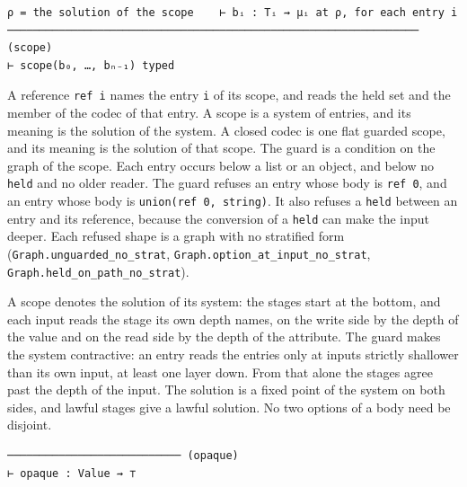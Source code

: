 \begin{definition}[(scope)]
\label{rule:scope}
\leanok
\begin{verbatim}
ρ = the solution of the scope    ⊢ bᵢ : Tᵢ ⇝ μᵢ at ρ, for each entry i
──────────────────────────────────────────────────────────────── (scope)
⊢ scope(b₀, …, bₙ₋₁) typed
\end{verbatim}
\end{definition}

A reference \texttt{ref\ i} names the entry \texttt{i} of its scope, and reads the held set and the member of the codec of
that entry. A scope is a system of entries, and its meaning is the solution of the system. A closed codec is one
flat guarded scope, and its meaning is the solution of that scope. The guard is a
condition on the graph of the scope. Each entry occurs below a list or an object, and below no \texttt{held} and no
older reader. The guard refuses an entry whose body is \texttt{ref\ 0}, and an entry whose body is
\texttt{union(ref\ 0,\ string)}. It also refuses a \texttt{held} between an entry and its reference, because the
conversion of a \texttt{held} can make the input deeper.
Each refused shape is a graph with no stratified form
(\texttt{Graph.unguarded\_no\_strat}, \texttt{Graph.option\_at\_input\_no\_strat}, \texttt{Graph.held\_on\_path\_no\_strat}).

\begin{theorem}
\label{thm:guarded-recursion}
\leanok
A scope denotes the solution of its system: the stages start at the bottom, and each input reads
the stage its own depth names, on the write side by the depth of the value and on the read side by the
depth of the attribute. The guard makes the system contractive: an entry reads the entries only at inputs strictly
shallower than its own input, at least one layer down. From that alone the stages agree past the depth of the input. The solution is a fixed point of
the system on both sides, and lawful stages give a lawful solution. No two options of a body need be disjoint.
\end{theorem}

\begin{definition}[(opaque)]
\label{rule:opaque}
\leanok
\begin{verbatim}
─────────────────────────── (opaque)
⊢ opaque : Value ⇝ ⊤
\end{verbatim}
\end{definition}

